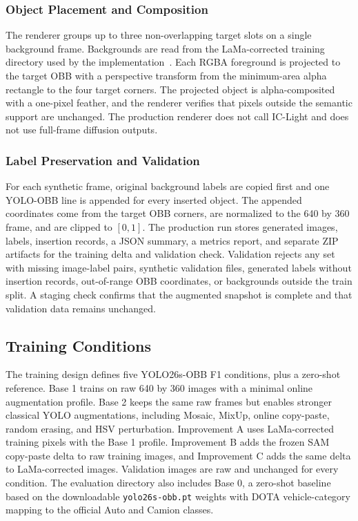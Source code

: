 \subsubsection{Object Placement and Composition}
\label{sec:object_composition}

The renderer groups up to three non-overlapping target slots on a single background frame. Backgrounds are read from the LaMa-corrected training directory used by the implementation~\cite{Suvorov2022LaMa}. Each RGBA foreground is projected to the target OBB with a perspective transform from the minimum-area alpha rectangle to the four target corners. The projected object is alpha-composited with a one-pixel feather, and the renderer verifies that pixels outside the semantic support are unchanged. The production renderer does not call IC-Light and does not use full-frame diffusion outputs.

\subsubsection{Label Preservation and Validation}
\label{sec:augmentation_validation}

For each synthetic frame, original background labels are copied first and one YOLO-OBB line is appended for every inserted object. The appended coordinates come from the target OBB corners, are normalized to the 640 by 360 frame, and are clipped to $[0,1]$. The production run stores generated images, labels, insertion records, a JSON summary, a metrics report, and separate ZIP artifacts for the training delta and validation check. Validation rejects any set with missing image-label pairs, synthetic validation files, generated labels without insertion records, out-of-range OBB coordinates, or backgrounds outside the train split. A staging check confirms that the augmented snapshot is complete and that validation data remains unchanged.

\subsection{Training Conditions}
\label{sec:training_conditions}

The training design defines five YOLO26s-OBB F1 conditions, plus a zero-shot reference. Base 1 trains on raw 640 by 360 images with a minimal online augmentation profile. Base 2 keeps the same raw frames but enables stronger classical YOLO augmentations, including Mosaic, MixUp, online copy-paste, random erasing, and HSV perturbation. Improvement A uses LaMa-corrected training pixels with the Base 1 profile. Improvement B adds the frozen SAM copy-paste delta to raw training images, and Improvement C adds the same delta to LaMa-corrected images. Validation images are raw and unchanged for every condition. The evaluation directory also includes Base 0, a zero-shot baseline based on the downloadable \texttt{yolo26s-obb.pt} weights with DOTA vehicle-category mapping to the official Auto and Camion classes.

